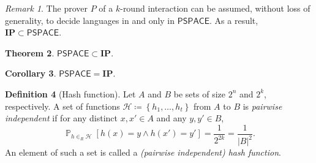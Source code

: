 \documentclass[10pt,letterpaper,cm]{nupset}
\theoremstyle{definition}
\newtheorem{definition}{Definition}[subsection]
\theoremstyle{theorem}
\newtheorem{theorem}[definition]{Theorem}
\newtheorem{corollary}[definition]{Corollary}
\theoremstyle{remark}
\newtheorem{remark}[definition]{Remark}
\renewcommand{\H}{\mathcal H}
\newcommand{\1}{\mathbf{1}}
\newcommand{\0}{\vec 0}
\DeclareMathOperator{\pr}{\mathbb{P}}
\begin{document}
\begin{remark}
The prover $P$ of a $k$-round interaction can be assumed, without loss of generality, to decide languages in and only in $\mathsf{PSPACE}$. As a result, $\mathbf{IP} \subset \mathsf{PSPACE}$.
\end{remark}

\begin{theorem}
$\mathsf{PSPACE} \subset \mathbf{IP}$.
\end{theorem}

\begin{corollary}
$\mathsf{PSPACE} = \mathbf{IP}$.
\end{corollary}

\bigskip

\begin{definition}[Hash function]
Let $A$ and $B$ be sets of size $2^n$ and $2^k$, respectively. A set of functions $\H\coloneqq \left\{h_1, \ldots, h_t\right\}$ from $A$ to $B$ is \textit{pairwise independent} if for any distinct $x, x' \in A$ and any $y, y' \in B$, $$  \pr_{h \in_R \H}\left[h(x) = y \land h(x') = y'\right] = \frac{1}{2^{2k}}  = \frac{1}{\left\lvert{B}\right\rvert^2}.$$ An element of such a set is called a \textit{(pairwise independent) hash function}.
\end{definition}
\end{document}
